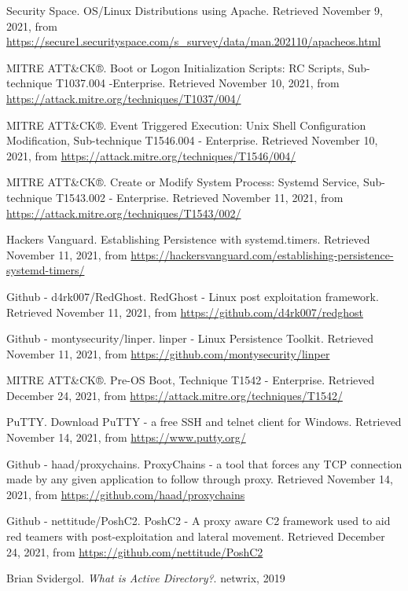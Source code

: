 \begin{thebibliography}{99}
Security Space. 
OS/Linux Distributions using Apache.
Retrieved November 9, 2021, from \url{https://secure1.securityspace.com/s_survey/data/man.202110/apacheos.html}

MITRE ATT\&CK®.
Boot or Logon Initialization Scripts: RC Scripts, Sub-technique T1037.004 -Enterprise.
Retrieved November 10, 2021, from \url{https://attack.mitre.org/techniques/T1037/004/}

MITRE ATT\&CK®.
Event Triggered Execution: Unix Shell Configuration Modification, Sub-technique T1546.004 - Enterprise.
Retrieved November 10, 2021, from \url{https://attack.mitre.org/techniques/T1546/004/}

MITRE ATT\&CK®.
Create or Modify System Process: Systemd Service, Sub-technique T1543.002 - Enterprise.
Retrieved November 11, 2021, from \url{https://attack.mitre.org/techniques/T1543/002/}

Hackers Vanguard.
Establishing Persistence with systemd.timers.
Retrieved November 11, 2021, from \url{https://hackersvanguard.com/establishing-persistence-systemd-timers/}

Github - d4rk007/RedGhost. 
RedGhost - Linux post exploitation framework.
Retrieved November 11, 2021, from \url{https://github.com/d4rk007/redghost}

Github - montysecurity/linper. 
linper - Linux Persistence Toolkit.
Retrieved November 11, 2021, from \url{https://github.com/montysecurity/linper}

MITRE ATT\&CK®.
Pre-OS Boot, Technique T1542 - Enterprise.	
Retrieved December 24, 2021, from \url{https://attack.mitre.org/techniques/T1542/}

PuTTY.
Download PuTTY - a free SSH and telnet client for Windows.
Retrieved November 14, 2021, from \url{https://www.putty.org/}

Github - haad/proxychains.
ProxyChains -  a tool that forces any TCP connection made by any given application to follow through proxy.
Retrieved November 14, 2021, from \url{https://github.com/haad/proxychains}

Github - nettitude/PoshC2.
PoshC2 - A proxy aware C2 framework used to aid red teamers with post-exploitation and lateral movement.	
Retrieved December 24, 2021, from \url{https://github.com/nettitude/PoshC2}

Brian Svidergol. 
\emph{What is Active Directory?}. 
netwrix, 2019


\end{thebibliography}
